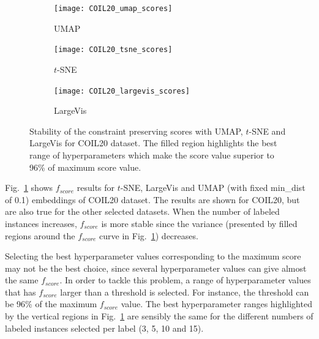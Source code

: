 \begin{figure}%
    \begin{subfigure}[b]{0.32\linewidth}
         \centering
         \texttt{[image: COIL20\_umap\_scores]}
         \caption{UMAP}
    \end{subfigure}
    \hfill
    \begin{subfigure}[b]{0.32\linewidth}
         \centering
         \texttt{[image: COIL20\_tsne\_scores]}
         \caption{$t$-SNE}
    \end{subfigure}
    \hfill
    \begin{subfigure}[b]{0.32\linewidth}
         \centering
         \texttt{[image: COIL20\_largevis\_scores]}
         \caption{LargeVis}
    \end{subfigure}
    \caption{Stability of the constraint preserving scores with UMAP, $t$-SNE and LargeVis for COIL20 dataset.
    The filled region highlights the best range of hyperparameters which make the score value superior to 96\% of maximum score value.}
    \label{fig:score:stability:COIL20}
\end{figure}

Fig.~\ref{fig:score:stability:COIL20} shows $f_{score}$ results for $t$-SNE, LargeVis and UMAP (with fixed {min\_dist} of 0.1) embeddings of COIL20 dataset.
The results are shown for COIL20, but are also true for the other selected datasets.
When the number of labeled instances increases, $f_{score}$ is more stable since the variance (presented by filled regions around the $f_{score}$ curve in Fig.~\ref{fig:score:stability:COIL20}) decreases.

Selecting the best hyperparameter values corresponding to the maximum score may not be the best choice, since several hyperparameter values can give almost the same $f_{score}$.
In order to tackle this problem, a range of hyperparameter values that has $f_{score}$ larger than a threshold is selected.
For instance, the threshold can be 96\% of the maximum $f_{score}$ value.
The best hyperparameter ranges highlighted by the vertical regions in Fig.~\ref{fig:score:stability:COIL20} are sensibly the same for the different numbers of labeled instances selected per label (3, 5, 10 and 15).

